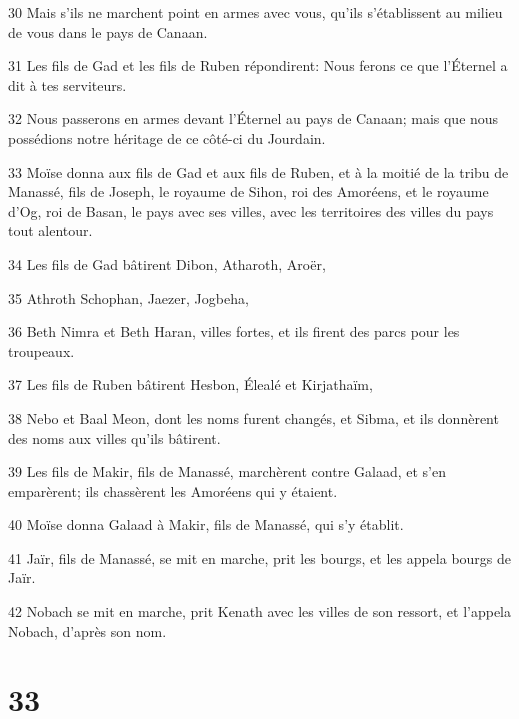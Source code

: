 \par 30 Mais s'ils ne marchent point en armes avec vous, qu'ils s'établissent au milieu de vous dans le pays de Canaan.
\par 31 Les fils de Gad et les fils de Ruben répondirent: Nous ferons ce que l'Éternel a dit à tes serviteurs.
\par 32 Nous passerons en armes devant l'Éternel au pays de Canaan; mais que nous possédions notre héritage de ce côté-ci du Jourdain.
\par 33 Moïse donna aux fils de Gad et aux fils de Ruben, et à la moitié de la tribu de Manassé, fils de Joseph, le royaume de Sihon, roi des Amoréens, et le royaume d'Og, roi de Basan, le pays avec ses villes, avec les territoires des villes du pays tout alentour.
\par 34 Les fils de Gad bâtirent Dibon, Atharoth, Aroër,
\par 35 Athroth Schophan, Jaezer, Jogbeha,
\par 36 Beth Nimra et Beth Haran, villes fortes, et ils firent des parcs pour les troupeaux.
\par 37 Les fils de Ruben bâtirent Hesbon, Élealé et Kirjathaïm,
\par 38 Nebo et Baal Meon, dont les noms furent changés, et Sibma, et ils donnèrent des noms aux villes qu'ils bâtirent.
\par 39 Les fils de Makir, fils de Manassé, marchèrent contre Galaad, et s'en emparèrent; ils chassèrent les Amoréens qui y étaient.
\par 40 Moïse donna Galaad à Makir, fils de Manassé, qui s'y établit.
\par 41 Jaïr, fils de Manassé, se mit en marche, prit les bourgs, et les appela bourgs de Jaïr.
\par 42 Nobach se mit en marche, prit Kenath avec les villes de son ressort, et l'appela Nobach, d'après son nom.

\chapter{33}

